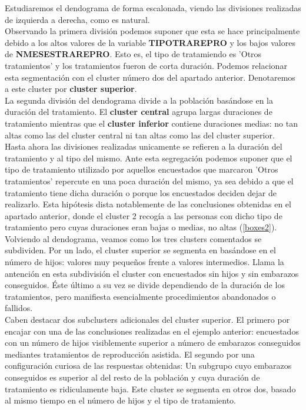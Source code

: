 \documentclass[11pt,a4paper]{article}
\begin{document}
	Estudiaremos el dendograma de forma escalonada, viendo las divisiones realizadas de izquierda a derecha, como es natural. \\
	
	Observando la primera división podemos suponer que esta se hace principalmente debido a los altos valores de la variable \textbf{TIPOTRAREPRO} y los bajos valores de \textbf{NMESESTRAREPRO}. Esto es, el tipo de tratamiendo es 'Otros tratamientos' y los tratamientos fueron de corta duración. Podemos relacionar esta segmentación con el cluster número dos del apartado anterior. Denotaremos a este cluster por \textbf{cluster superior}. \\
	
	La segunda división del dendograma divide a la población basándose en la duración del tratamiento. El \textbf{cluster central} agrupa largas duraciones de tratamiento mientras que el \textbf{cluster inferior} contiene duraciones medias: no tan altas como las del cluster central ni tan altas como las del cluster superior. \\

	Hasta ahora las divisiones realizadas unicamente se refieren a la duración del tratamiento y al tipo del mismo. Ante esta segregación podemos suponer que el tipo de tratamiento utilizado por aquellos encuestados que marcaron 'Otros tratamientos' repercute en una poca duración del mismo, ya sea debido a que el tratamiento tiene dicha duración o porque los encuestados deciden dejar de realizarlo. Esta hipótesis dista notablemente de las conclusiones obtenidas en el apartado anterior, donde el cluster 2 recogía a las personas con dicho tipo de tratamiento pero cuyas duraciones eran bajas o medias, no altas (\ref{boxes2}). \\

	Volviendo al dendograma, veamos como los tres clusters comentados se subdividen. Por un lado, el cluster superior se segmenta en basándose en el número de hijos: valores muy pequeños frente a valores intermedios. Llama la antención en esta subdivisión el cluster con encuestados sin hijos y sin embarazos conseguidos. Éste último a su vez se divide dependiendo de la duración de los tratamientos, pero manifiesta esencialmente procedimientos abandonados o fallidos. \\
	
	Caben destacar dos subclusters adicionales del cluster superior. El primero por encajar con una de las conclusiones realizadas en el ejemplo anterior: encuestados con un número de hijos visiblemente superior a número de embarazos conseguidos mediantes tratamientos de reproducción asistida. El segundo por una configuración curiosa de las respuestas obtenidas: Un subgrupo cuyo embarazos conseguidos es superior al del resto de la población y cuya duración de tratamiento es ridiculamente baja. Este cluster se segmenta en otros dos, basado al mismo tiempo en el número de hijos y el tipo de tratamiento. \\
	
\end{document}

